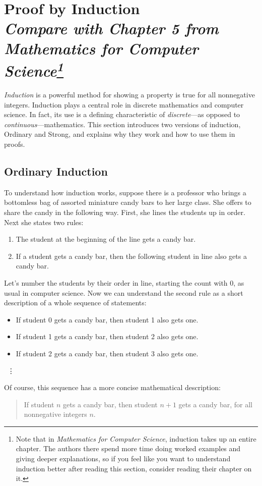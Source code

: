 \documentclass[11pt,oneside]{book}
\theoremstyle{definition}
\begin{document}
\section[Proof by Induction]{Proof by Induction\\[0.5ex]
\normalsize\normalfont\textit{
    Compare with Chapter 5 from \emph{Mathematics for Computer Science}\footnote{
    Note that in \emph{Mathematics for Computer Science}, induction takes up an entire chapter.
    The authors there spend more time doing worked examples and giving deeper explanations, so if you feel like you want to understand induction better after reading this section, consider reading their chapter on it.
    }
}}\label{sec:InductionProof}
\emph{Induction} is a powerful method for showing a property is true for all nonnegative integers.
Induction plays a central role in discrete mathematics and computer science.
In fact, its use is a defining characteristic of \emph{discrete}---as opposed to \emph{continuous}---mathematics. This section introduces two versions of induction, Ordinary and Strong, and explains why they work and how to use them in proofs.


\subsection{Ordinary Induction}
To understand how induction works, suppose there is a professor who brings a bottomless bag of assorted miniature candy bars to her large class.
She offers to share the candy in the following way.
First, she lines the students up in order.
Next she states two rules:

\begin{enumerate}
    \item The student at the beginning of the line gets a candy bar.

    \item If a student gets a candy bar, then the following student in line also gets a candy bar.
\end{enumerate}

Let's number the students by their order in line, starting the count with 0, as usual in computer science.
Now we can understand the second rule as a short description of a whole sequence of statements:

\begin{itemize}
    \item If student 0 gets a candy bar, then student 1 also gets one.

    \item If student 1 gets a candy bar, then student 2 also gets one.

    \item If student 2 gets a candy bar, then student 3 also gets one.
\end{itemize}
\begin{center} \ \vdots \end{center}
Of course, this sequence has a more concise mathematical description:
\begin{quote}
    If student $n$ gets a candy bar, then student $n + 1$ gets a candy bar, for all nonnegative integers $n$.
\end{quote}
\end{document}

